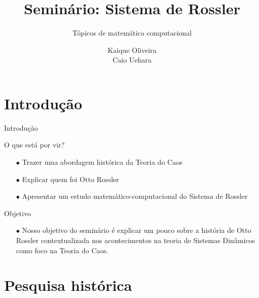 \documentclass{beamer}
\title{Seminário: Sistema de Rossler}
\subtitle{Tópicos de matemática computacional}
\author[]{Kaique Oliveira \\ Caio Uehara}
\begin{document}
	\typesetFrontSlides



\section{Introdução}


\begin{frame}{Introdução}

    \begin{exampleblock}{O que está por vir?}
    	\begin{itemize}
    	\item [$\bullet$] Trazer uma abordagem histórica da Teoria do Caos
		\item [$\bullet$] Explicar quem foi Otto Rossler
		\item [$\bullet$] Apresentar um estudo matemático-computacional do Sistema de 	Rossler 
		\end{itemize}
    \end{exampleblock}
    
        \begin{exampleblock}{Objetivo}
    	\begin{itemize}
		\item [$\bullet$] Nosso objetivo do seminário é explicar um pouco sobre a história de Otto Rossler contextualizada nos acontecimentos na teoria de Sistemas Dinâmicos como foco na Teoria do Caos.
    	\end{itemize}
    \end{exampleblock}
    
\end{frame}



\section{Pesquisa histórica}
\end{document}
